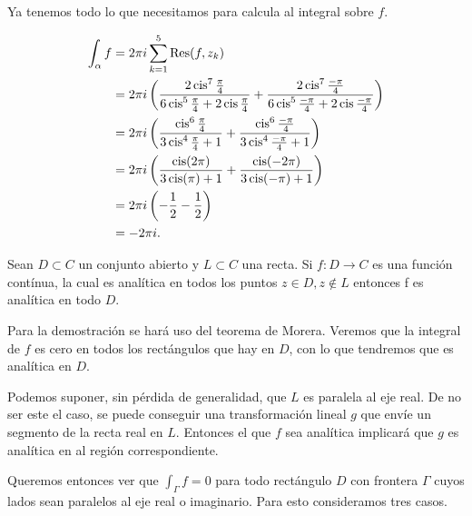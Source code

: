\documentclass[11pt,letter]{article}
\begin{document}
Ya tenemos todo lo que necesitamos para calcula al integral sobre $f$.

\begin{align*}
	\int_\alpha f &= 2\pi i \sum_{k=1}^5\operatorname{Res}(f, z_k)\\
			     &= 2\pi i \left(
			     		\frac{2\operatorname{cis}^7\frac{\pi}{4}}{6\operatorname{cis}^5\frac{\pi}{4}+2\operatorname{cis}\frac{\pi}{4}}
			     		+ \frac{2\operatorname{cis}^7\frac{-\pi}{4}}{6\operatorname{cis}^5\frac{-\pi}{4}+2\operatorname{cis}\frac{-\pi}{4}}
			     			\right)\\
			     &= 2\pi i \left(
			     		\frac{\operatorname{cis}^6\frac{\pi}{4}}{3\operatorname{cis}^4\frac{\pi}{4}+1}
			     		+ \frac{\operatorname{cis}^6\frac{-\pi}{4}}{3\operatorname{cis}^4\frac{-\pi}{4}+1}
			     			\right)\\
			     &= 2\pi i \left(
			     		\frac{\operatorname{cis} (2\pi)}{3\operatorname{cis}(\pi)+1}
			     		+ \frac{\operatorname{cis}(-2\pi)}{3\operatorname{cis}(-\pi)+1}
			     			\right)\\
			     &= 2\pi i \left(-\frac12 -\frac12\right)\\
			     &= -2\pi i.
\end{align*}

\exercise Sean $D\subset C$ un conjunto abierto y $L\subset C$ una
recta. Si $f : D\to C$ es una función contínua, la cual es analítica
en todos los puntos $z\in D, z\not\in L$ entonces f es analítica en
todo $D$.

\solution Para la demostración se hará uso del teorema de Morera.
Veremos que la integral de $f$ es cero en todos los rectángulos que
hay en $D$, con lo que tendremos que es analítica en $D$.

Podemos suponer, sin pérdida de generalidad, que $L$ es paralela al
eje real. De no ser este el caso, se puede conseguir una
transformación lineal $g$ que envíe un segmento de la recta real en
$L$. Entonces el que $f$ sea analítica implicará que $g$ es analítica
en al región correspondiente.

Queremos entonces ver que $\int_\Gamma f=0$ para todo rectángulo $D$ con
frontera $\Gamma$ cuyos lados sean paralelos al eje real o imaginario.
Para esto consideramos tres casos.
\end{document}

